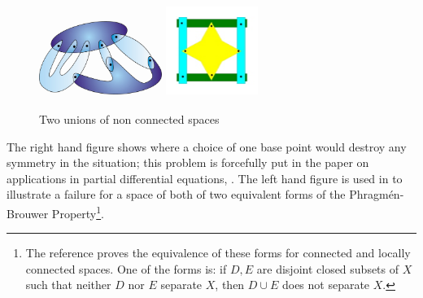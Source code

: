 \documentclass{elsarticle}
\begin{document}
\begin{figure}[h]\centering
\includegraphics[width=4cm,height=2.5cm]{fig6_10cs.jpg}  \qquad \qquad  \includegraphics[width=3cm,height=3cm]{union.jpg}

\caption{Two unions of non connected spaces}\label{fig:unions}

\end{figure}
The right hand figure shows where a choice of one base point would destroy any symmetry
in the situation; this problem  is forcefully put in the paper on applications in partial differential equations,  \cite{PR15}. The left hand figure  is
used in \cite{Acb15}  to illustrate a failure for a space of both of two equivalent forms of the Phragm\'en-Brouwer Property\footnote{The reference \cite{Wilder1} proves the equivalence of these forms for connected and locally connected spaces.   One of the forms  is: if $D, E$ are disjoint closed subsets of $X$ such that neither $D$ nor $E$ separate $X$, then $D \cup E$ does not
separate $X$.}.
\end{document}
